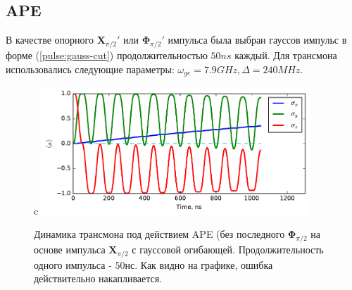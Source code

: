 \documentclass[12pt, twoside]{report}
\numberwithin{equation}{section}
\numberwithin{figure}{section}
\begin{document}
\subsection{APE}
В качестве опорного $\mathbf{X}_{\pi/2}'$ или $\mathbf{\Phi}_{\pi/2}'$ импульса была выбран гауссов импульс в форме (\ref{pulse:gauss-cut}) продолжительностью $50ns$ каждый. Для трансмона использовались следующие параметры: $\omega_{ge} = 7.9GHz, \Delta = 240MHz$. 
\begin{figure}[h]{c}
\includegraphics[width = 0.9\textwidth]{Pictures2/APE-sample}
\caption{Динамика трансмона под действием APE (без последного $\mathbf{\Phi}_{\pi/2}$ на основе импульса $\mathbf{X}_{\pi/2}$ с гауссовой огибающей. Продолжительность одного импульса - $50\text{нс}$. Как видно на графике, ошибка действительно накапливается. }
\end{figure}
\end{document}
